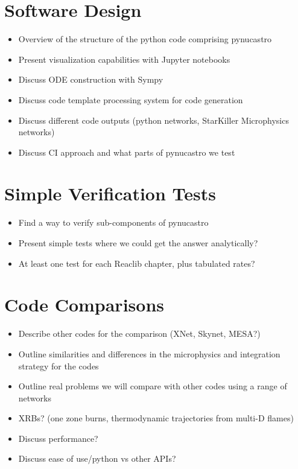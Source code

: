 \documentclass[preprint,times,tighten]{aastex63}
\begin{document}
\section{Software Design}\label{Sec:Design}

\begin{itemize}
    \item Overview of the structure of the python code comprising pynucastro 
    \item Present visualization capabilities with Jupyter notebooks 
    \item Discuss ODE construction with Sympy 
    \item Discuss code template processing system for code generation
    \item Discuss different code outputs (python networks, StarKiller Microphysics networks)
    \item Discuss CI approach and what parts of pynucastro we test
\end{itemize}

\section{Simple Verification Tests}\label{Sec:Verification}

\begin{itemize}
    \item Find a way to verify sub-components of pynucastro
    \item Present simple tests where we could get the answer analytically?
    \item At least one test for each Reaclib chapter, plus tabulated rates?
\end{itemize}

\section{Code Comparisons}\label{Sec:Comparisons}

\begin{itemize}
    \item Describe other codes for the comparison (XNet, Skynet, MESA?)
    \item Outline similarities and differences in the microphysics and integration strategy for the codes
    \item Outline real problems we will compare with other codes using a range of networks
    \item XRBs? (one zone burns, thermodynamic trajectories from multi-D flames)
    \item Discuss performance?
    \item Discuss ease of use/python vs other APIs?
\end{itemize}
\end{document}
